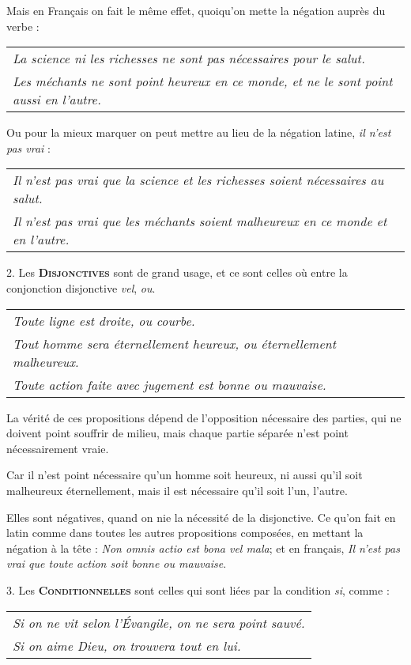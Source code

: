 Mais en Français on fait le même effet, quoiqu'on mette la négation auprès du verbe :

    \begin{tabularx}{\textwidth}{X}
		\emph{La science ni les richesses ne sont pas nécessaires pour le salut.} \\
		\emph{Les méchants ne sont point heureux en ce monde, et ne le sont point aussi en l'autre.} \\
    \end{tabularx}

Ou pour la mieux marquer on peut mettre au lieu de la négation latine, \emph{il n'est pas vrai} :
	\begin{tabularx}{\textwidth}{X}
	\emph{Il n'est pas vrai que la science et les richesses soient nécessaires au salut.} \\
	\emph{Il n'est pas vrai que les méchants soient malheureux en ce monde et en l'autre.} \\
	\end{tabularx}

\bigbreak
{2.} Les {\bfseries\scshape Disjonctives} sont de grand usage, et ce sont celles où entre la conjonction disjonctive \emph{vel}, \emph{ou}.
	\begin{tabularx}{\textwidth}{X}
		\emph{Toute ligne est droite, ou courbe.} \\
		\emph{Tout homme sera éternellement heureux, ou éternellement malheureux.} \\
		\emph{Toute action faite avec jugement est bonne ou mauvaise.} \\
	\end{tabularx}

La vérité de ces propositions dépend de l'opposition nécessaire
des parties, qui ne doivent point souffrir de milieu, mais chaque partie séparée n'est point nécessairement vraie.

Car il n'est point nécessaire qu'un homme soit heureux, ni aussi qu'il soit malheureux éternellement, mais il est nécessaire qu'il soit l'un, l'autre.

Elles sont négatives, quand on nie la nécessité de la disjonctive. Ce qu'on fait en latin comme dans toutes les autres propositions composées, en mettant la négation à la tête : \emph{Non omnis actio est bona vel mala}; et en français, \emph{Il n'est pas vrai que toute action soit bonne ou mauvaise}.


\bigbreak
{3.} Les {\bfseries\scshape Conditionnelles} sont celles qui sont liées par la condition \emph{si}, comme :
	\begin{tabularx}{\textwidth}{X}
		\emph{Si on ne vit selon l'Évangile, on ne sera point sauvé.} \\
		\emph{Si on aime Dieu, on trouvera tout en lui.} \\
	\end{tabularx}

